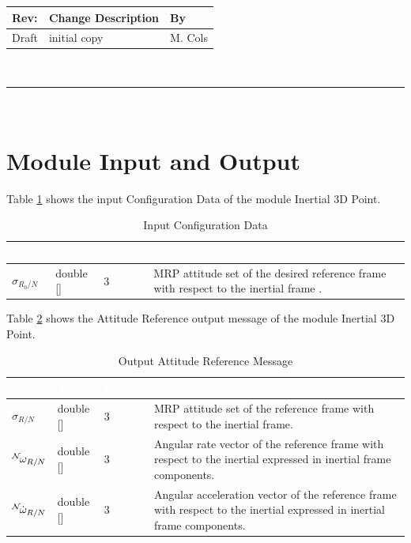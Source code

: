 \documentclass[]{AVSSimReportMemo}
\begin{document}
\makeCover


%
%
\pagestyle{empty}
{\renewcommand{\arraystretch}{2}
\noindent
\begin{longtable}{|p{0.5in}|p{4.5in}|p{1.14in}|}
\hline
{\bfseries Rev}: & {\bfseries Change Description} & {\bfseries By} \\
\hline
Draft & initial copy & M. Cols \\
\hline

\end{longtable}
}

\newpage
\setcounter{page}{1}
\pagestyle{fancy}

\tableofcontents
~\\ \hrule ~\\

\section{Module Input and Output}
Table \ref{tab:inputTable} shows the input Configuration Data of the module Inertial 3D Point.
\begin{table}[h!]
	\centering
	\caption{Input Configuration Data}
	\begin{tabular}{|l|l|l|p{3in}|}
		\hline
		\rowcolor{BrickRed}
		\textcolor{white}{Name} & \textcolor{white}{Type} & 
		\textcolor{white}{Length} & 
		\textcolor{white}{Description}  \\ \hline
		$\sigma_{R_0/N}$ & double [] & 3 & 
		MRP attitude set of the desired reference frame with respect to the inertial frame . \\ \hline
	\end{tabular}
	\label{tab:inputTable}
\end{table}

Table \ref{tab:outputTable} shows the Attitude Reference output message of the module Inertial 3D Point.
\begin{table}[h!]
	\centering
	\caption{Output Attitude Reference Message}
	\begin{tabular}{|l|l|l|p{3in}|}
		\hline
		\rowcolor{BrickRed}
		\textcolor{white}{Name} & \textcolor{white}{Type} & 
		\textcolor{white}{Length} & 
		\textcolor{white}{Description}  \\ \hline
		$\sigma_{R/N}$ & double [] & 3 & 
		MRP attitude set of the reference frame with respect to the inertial frame. \\ \hline
		$\leftexp{N} \omega_{R/N}$ & double [] & 3 & 
		Angular rate vector of the reference frame with respect to the inertial expressed in inertial frame components. \\ \hline
		$\leftexp{N} {\dot{\omega}_{R/N}}$ & double [] & 3 & 
		Angular acceleration vector of the reference frame with respect to the inertial expressed in inertial frame components. \\ \hline
	\end{tabular}
	\label{tab:outputTable}
\end{table}
\newpage
\end{document}
